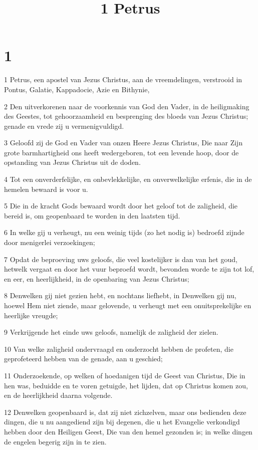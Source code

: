 

\title{1 Petrus}



\chapter{1}

\par 1 Petrus, een apostel van Jezus Christus, aan de vreemdelingen, verstrooid in Pontus, Galatie, Kappadocie, Azie en Bithynie,
\par 2 Den uitverkorenen naar de voorkennis van God den Vader, in de heiligmaking des Geestes, tot gehoorzaamheid en besprenging des bloeds van Jezus Christus; genade en vrede zij u vermenigvuldigd.
\par 3 Geloofd zij de God en Vader van onzen Heere Jezus Christus, Die naar Zijn grote barmhartigheid ons heeft wedergeboren, tot een levende hoop, door de opstanding van Jezus Christus uit de doden.
\par 4 Tot een onverderfelijke, en onbevlekkelijke, en onverwelkelijke erfenis, die in de hemelen bewaard is voor u.
\par 5 Die in de kracht Gods bewaard wordt door het geloof tot de zaligheid, die bereid is, om geopenbaard te worden in den laatsten tijd.
\par 6 In welke gij u verheugt, nu een weinig tijds (zo het nodig is) bedroefd zijnde door menigerlei verzoekingen;
\par 7 Opdat de beproeving uws geloofs, die veel kostelijker is dan van het goud, hetwelk vergaat en door het vuur beproefd wordt, bevonden worde te zijn tot lof, en eer, en heerlijkheid, in de openbaring van Jezus Christus;
\par 8 Denwelken gij niet gezien hebt, en nochtans liefhebt, in Denwelken gij nu, hoewel Hem niet ziende, maar gelovende, u verheugt met een onuitsprekelijke en heerlijke vreugde;
\par 9 Verkrijgende het einde uws geloofs, namelijk de zaligheid der zielen.
\par 10 Van welke zaligheid ondervraagd en onderzocht hebben de profeten, die geprofeteerd hebben van de genade, aan u geschied;
\par 11 Onderzoekende, op welken of hoedanigen tijd de Geest van Christus, Die in hen was, beduidde en te voren getuigde, het lijden, dat op Christus komen zou, en de heerlijkheid daarna volgende.
\par 12 Denwelken geopenbaard is, dat zij niet zichzelven, maar ons bedienden deze dingen, die u nu aangediend zijn bij degenen, die u het Evangelie verkondigd hebben door den Heiligen Geest, Die van den hemel gezonden is; in welke dingen de engelen begerig zijn in te zien.
